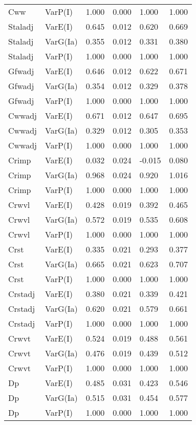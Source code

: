 \begin{center}
\begin{longtable}{|p{0.6in}|p{0.7in}|p{0.6in}|p{0.6in}|p{0.6in}|p{0.6in}|}
  Cww & VarP(I) & 1.000 & 0.000 & 1.000 & 1.000 \\ 
  Staladj & VarE(I) & 0.645 & 0.012 & 0.620 & 0.669 \\ 
  Staladj & VarG(Ia) & 0.355 & 0.012 & 0.331 & 0.380 \\ 
  Staladj & VarP(I) & 1.000 & 0.000 & 1.000 & 1.000 \\ 
  Gfwadj & VarE(I) & 0.646 & 0.012 & 0.622 & 0.671 \\ 
  Gfwadj & VarG(Ia) & 0.354 & 0.012 & 0.329 & 0.378 \\ 
  Gfwadj & VarP(I) & 1.000 & 0.000 & 1.000 & 1.000 \\ 
  Cwwadj & VarE(I) & 0.671 & 0.012 & 0.647 & 0.695 \\ 
  Cwwadj & VarG(Ia) & 0.329 & 0.012 & 0.305 & 0.353 \\ 
  Cwwadj & VarP(I) & 1.000 & 0.000 & 1.000 & 1.000 \\ 
  Crimp & VarE(I) & 0.032 & 0.024 & -0.015 & 0.080 \\ 
  Crimp & VarG(Ia) & 0.968 & 0.024 & 0.920 & 1.016 \\ 
  Crimp & VarP(I) & 1.000 & 0.000 & 1.000 & 1.000 \\ 
  Crwvl & VarE(I) & 0.428 & 0.019 & 0.392 & 0.465 \\ 
  Crwvl & VarG(Ia) & 0.572 & 0.019 & 0.535 & 0.608 \\ 
  Crwvl & VarP(I) & 1.000 & 0.000 & 1.000 & 1.000 \\ 
  Crst & VarE(I) & 0.335 & 0.021 & 0.293 & 0.377 \\ 
  Crst & VarG(Ia) & 0.665 & 0.021 & 0.623 & 0.707 \\ 
  Crst & VarP(I) & 1.000 & 0.000 & 1.000 & 1.000 \\ 
  Crstadj & VarE(I) & 0.380 & 0.021 & 0.339 & 0.421 \\ 
  Crstadj & VarG(Ia) & 0.620 & 0.021 & 0.579 & 0.661 \\ 
  Crstadj & VarP(I) & 1.000 & 0.000 & 1.000 & 1.000 \\ 
  Crwvt & VarE(I) & 0.524 & 0.019 & 0.488 & 0.561 \\ 
  Crwvt & VarG(Ia) & 0.476 & 0.019 & 0.439 & 0.512 \\ 
  Crwvt & VarP(I) & 1.000 & 0.000 & 1.000 & 1.000 \\ 
  Dp & VarE(I) & 0.485 & 0.031 & 0.423 & 0.546 \\ 
  Dp & VarG(Ia) & 0.515 & 0.031 & 0.454 & 0.577 \\ 
  Dp & VarP(I) & 1.000 & 0.000 & 1.000 & 1.000 \\ 

\end{longtable}
\end{center}
